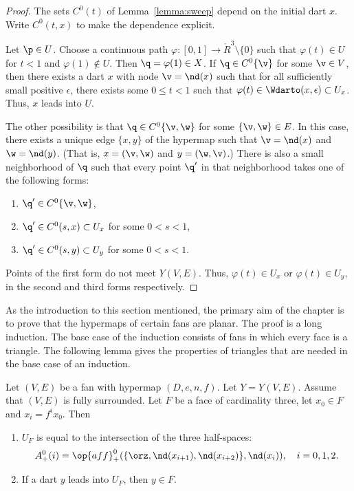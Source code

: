 \begin{proof}  
The sets $C^0(t)$ of Lemma~\ref{lemma:sweep} depend on the initial dart $x$.
Write $C^0(t,x)$ to make the dependence explicit.

Let $\p\in U$.  Choose a continuous path $\varphi:[0,1]\to
\ring{R}^3\setminus\{0\}$ such that $\varphi(t)\in U$ for $t<1$ and
$\varphi(1)\not\in U$.  Then $\q=\varphi(1)\in X$.  If $\q\in
C^0\{\v\}$ for some $\v\in V$, then there exists a dart $x$ with
node $\v = \nd(x)$ such that for all sufficiently small positive
$\epsilon$, there exists some $0\le t < 1$ such that $\varphi(t)\in
\Wdarto(x,\epsilon)\subset U_x$.  Thus, $x$ leads into $U$.
%

The other possibility is that $\q\in C^0\{\v,\w\}$ for some
$\{\v,\w\}\in E$.  In this case, there exists a unique edge $\{x,y\}$ of
the hypermap such that $\v=\nd(x)$ and $\w=\nd(y)$.  (That is,
$x=(\v,\w)$ and $y=(\w,\v)$.)  There is also a small neighborhood of
$\q$ such that every point $\q'$ in that neighborhood takes one of
the following forms:
\begin{enumerate}\wasitemize  \item $\q'\in C^0\{\v,\w\}$,
\item $\q'\in C^0(s,x)\subset U_x$ for some $0<s<1$,
\item $\q'\in C^0(s,y)\subset U_y$ for some $0<s<1$.
\end{enumerate}\wasitemize 
Points of the first form do not meet $Y(V,E)$.  Thus, $\varphi(t)\in U_x$
or $\varphi(t)\in U_y$, in the second and third forms respectively.
\end{proof}
%

As the introduction to this section mentioned, the primary aim of the chapter
is to prove that the hypermaps of certain fans are planar.  The proof is a long
induction.  The base case of the induction consists of fans in which every face
is a triangle.  The following lemma gives the properties of triangles that are
needed in the base case of an induction.

\begin{lemma} \label{lemma:triangle}
Let $(V,E)$ be a fan with hypermap $(D,e,n,f)$.  Let $Y=Y(V,E)$.
Assume that $(V,E)$ is fully surrounded. Let  $F$ be a face of
cardinality three, let $x_0\in F$ and  $x_i = f^i x_0$. Then
%
\begin{enumerate}\wasitemize   
\item $U_F$ is equal to the intersection of the three half-spaces:
\[ A^0_+(i)=\op{aff}_+^0(\{\orz,\nd(x_{i+1}),\nd(x_{i+2})\},\nd(x_i)),\quad
i=0,1,2.\] 
\item If a dart $y$ leads into $U_F$, then $y\in F$.
\end{enumerate}\wasitemize 
\end{lemma}
%

